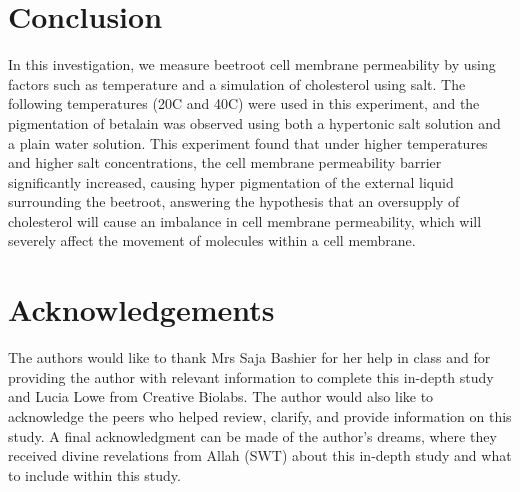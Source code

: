 \documentclass[a4paper,12pt,twoside,english]{all-in-one} %
\begin{document}
\section{Conclusion}
In this investigation, we measure beetroot cell membrane permeability by using factors such as temperature and a simulation of cholesterol using salt. The following temperatures (20C and 40C) were used in this experiment, and the pigmentation of betalain was observed using both a hypertonic salt solution and a plain water solution. This experiment found that under higher temperatures and higher salt concentrations, the cell membrane permeability barrier significantly increased, causing hyper pigmentation of the external liquid surrounding the beetroot, answering the hypothesis that an oversupply of cholesterol will cause an imbalance in cell membrane permeability, which will severely affect the movement of molecules within a cell membrane.

\newpage
\section{Acknowledgements}
The authors would like to thank Mrs Saja Bashier for her help in class and for providing the author with relevant information to complete this in-depth study and Lucia Lowe from Creative Biolabs.
The author would also like to acknowledge the peers who helped review, clarify, and provide information on this study.
A final acknowledgment can be made of the author's dreams, where they received divine revelations from Allah (SWT) about this in-depth study and what to include within this study.


\clearpage
\pagestyle{\auxsettings}
\printbibliography[heading=bibintoc]
\end{document}
